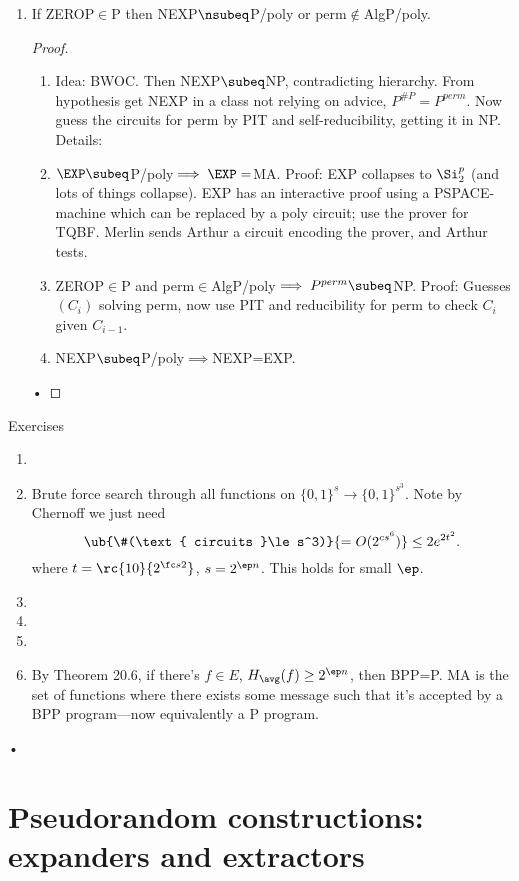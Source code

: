 \begin{enumerate}
\begin{proof}
\begin{enumerate}
Build a PRG to transform... 
\end{enumerate}
\end{proof}
\item 
\begin{thm}
If ZEROP$\in$P then NEXP$\nsubeq $P/poly or perm$\nin$AlgP/poly.
\end{thm}
\begin{proof}
\begin{enumerate}
\item
Idea: BWOC. Then NEXP$\subeq$NP, contradicting hierarchy. From hypothesis get NEXP in a class not relying on advice, $P^{\#P}=P^{perm}$. Now guess the circuits for perm by PIT and self-reducibility, getting it in NP. Details:
\item $\EXP\subeq$P/poly$\implies\EXP=$MA. Proof: EXP collapses to $\Si_2^p$ (and lots of things collapse). EXP has an interactive proof using a PSPACE-machine which can be replaced by a poly circuit; use the prover for TQBF. Merlin sends Arthur a circuit encoding the prover, and Arthur tests.
\item ZEROP$\in$P and perm$\in$AlgP/poly$\implies P^{perm}\subeq $NP. Proof: Guesses $(C_i)$ solving perm, now use PIT and reducibility for perm to check $C_i$ given $C_{i-1}$.
\item NEXP$\subeq$P/poly$\implies$NEXP=EXP.  
\end{enumerate}•
\end{proof}
\end{enumerate}
Exercises
\begin{enumerate}
\item
\item Brute force search through all functions on $\{0,1\}^s\to \{0,1\}^{s^3}$. Note by Chernoff we just need 
\[
\ub{\#(\text{ circuits }\le s^3)}{=O(2^{cs^6})}\le 2e^{2t^2}.
\] 
where $t=\rc{10}{2^{\fc s2}}$, $s=2^{\ep n}$. This holds for small $\ep$.
\item
\item
\item 
\item By Theorem 20.6, if there's $f\in E$, $H_{\avg}(f)\ge 2^{\ep n}$, then BPP=P. MA is the set of functions where there exists some message such that it's accepted by a BPP program---now equivalently a P program.
\end{enumerate}•
\section{Pseudorandom constructions: expanders and extractors}

